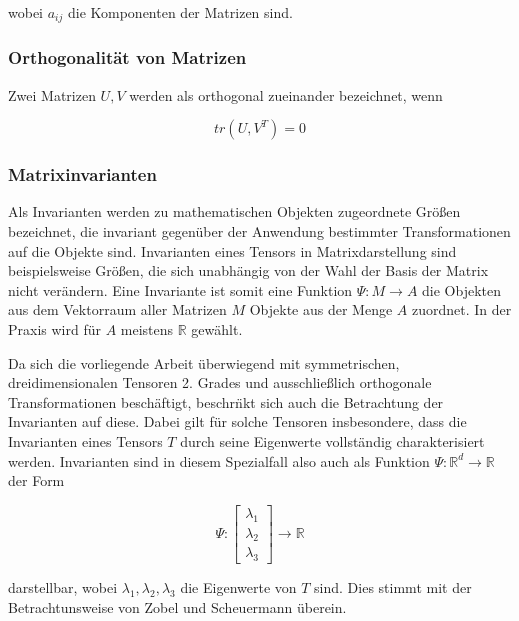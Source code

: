 \documentclass[a4paper,fontsize=12pt,toc=bib,halfparskip]{scrartcl}
\begin{document}
wobei $a_{ij}$ die Komponenten der Matrizen sind.

\subsubsection{Orthogonalit\"at von Matrizen}
Zwei Matrizen $U,V$ werden als orthogonal zueinander bezeichnet, wenn \cite{ennis2006orthogonal}

\begin{equation}
tr(U,V^{T}) = 0
\end{equation}

\subsubsection{Matrixinvarianten}
\label{Matrixinvarianten}
Als Invarianten werden zu mathematischen Objekten zugeordnete Gr\"o{\ss}en bezeichnet, die invariant gegen\"uber der Anwendung bestimmter Transformationen auf die Objekte sind. Invarianten eines Tensors in Matrixdarstellung sind beispielsweise Gr\"o{\ss}en, die sich unabh\"angig von der Wahl der Basis der Matrix nicht ver\"andern\cite{ennis2006orthogonal}. Eine Invariante ist somit eine Funktion $\Psi: M \rightarrow A$ die Objekten aus dem Vektorraum aller Matrizen $M$ Objekte aus der Menge $A$ zuordnet. In der Praxis wird f\"ur $A$ meistens $\mathbb{R}$ gew\"ahlt.

Da sich die vorliegende Arbeit \"uberwiegend mit symmetrischen, dreidimensionalen Tensoren 2. Grades und ausschlie{\ss}lich orthogonale Transformationen besch\"aftigt, beschr\"nkt sich auch die Betrachtung der Invarianten auf diese. Dabei gilt f\"ur solche Tensoren insbesondere, dass die Invarianten eines Tensors $T$ durch seine Eigenwerte vollst\"andig charakterisiert werden. Invarianten sind in diesem Spezialfall also auch als Funktion $\Psi: \mathbb{R}^d \rightarrow \mathbb{R}$ der Form

\begin{equation}
	\Psi:
	\begin{bmatrix}
	\lambda_1\\
	\lambda_2\\
	\lambda_3
	\end{bmatrix}
	\rightarrow \mathbb{R}
\end{equation}

darstellbar, wobei $\lambda_1, \lambda_2, \lambda_3$ die Eigenwerte von $T$ sind. Dies stimmt mit der Betrachtunsweise von Zobel und Scheuermann \cite{zobel2017extremal} \"uberein.
\end{document}
